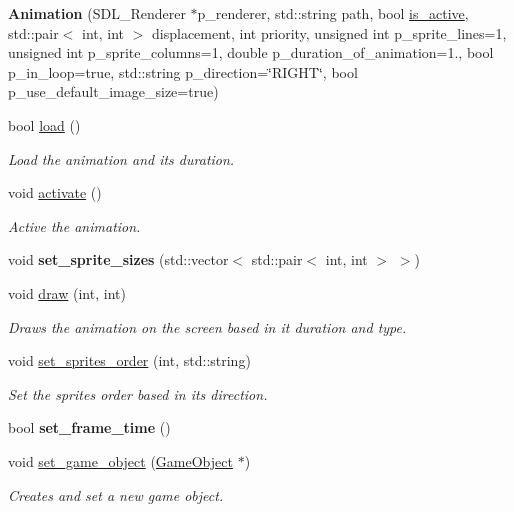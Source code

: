 \begin{DoxyCompactItemize}
\item 
{\bfseries Animation} (S\+D\+L\+\_\+\+Renderer $\ast$p\+\_\+renderer, std\+::string path, bool \hyperlink{classengine_1_1_component_ae1a97027b9862ee3e41e6566501d765e}{is\+\_\+active}, std\+::pair$<$ int, int $>$ displacement, int priority, unsigned int p\+\_\+sprite\+\_\+lines=1, unsigned int p\+\_\+sprite\+\_\+columns=1, double p\+\_\+duration\+\_\+of\+\_\+animation=1., bool p\+\_\+in\+\_\+loop=true, std\+::string p\+\_\+direction=\char`\"{}R\+I\+G\+HT\char`\"{}, bool p\+\_\+use\+\_\+default\+\_\+image\+\_\+size=true)\hypertarget{classengine_1_1_animation_aa2cfdba04398181a816a77ee27d46868}{}\label{classengine_1_1_animation_aa2cfdba04398181a816a77ee27d46868}

\item 
bool \hyperlink{classengine_1_1_animation_a1c98b3767d4c63f9ef080fbaf913b06c}{load} ()
\begin{DoxyCompactList}\small\item\em Load the animation and its duration. \end{DoxyCompactList}\item 
void \hyperlink{classengine_1_1_animation_aed8e1d2ca377855e1098fb9491e67ae4}{activate} ()
\begin{DoxyCompactList}\small\item\em Active the animation. \end{DoxyCompactList}\item 
void {\bfseries set\+\_\+sprite\+\_\+sizes} (std\+::vector$<$ std\+::pair$<$ int, int $>$ $>$)\hypertarget{classengine_1_1_animation_a5af8b9eb0bf5f6e6c87a9a03fdefac5c}{}\label{classengine_1_1_animation_a5af8b9eb0bf5f6e6c87a9a03fdefac5c}

\item 
void \hyperlink{classengine_1_1_animation_a6fc9f67fd4aa3bc6a26f0a2d98015938}{draw} (int, int)
\begin{DoxyCompactList}\small\item\em Draws the animation on the screen based in it duration and type. \end{DoxyCompactList}\item 
void \hyperlink{classengine_1_1_animation_a027ec68d45a5226248c13cd14b1c5f2a}{set\+\_\+sprites\+\_\+order} (int, std\+::string)
\begin{DoxyCompactList}\small\item\em Set the sprites order based in its direction. \end{DoxyCompactList}\item 
bool {\bfseries set\+\_\+frame\+\_\+time} ()\hypertarget{classengine_1_1_animation_a419f0c0142e424ea4b65d5f5f0442c8e}{}\label{classengine_1_1_animation_a419f0c0142e424ea4b65d5f5f0442c8e}

\item 
void \hyperlink{classengine_1_1_animation_a8c2c7a2d4f9053429910acca480fcb99}{set\+\_\+game\+\_\+object} (\hyperlink{classengine_1_1_game_object}{Game\+Object} $\ast$)
\begin{DoxyCompactList}\small\item\em Creates and set a new game object. \end{DoxyCompactList}\end{DoxyCompactItemize}
